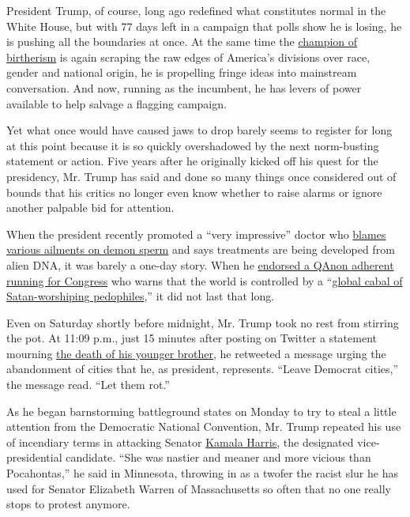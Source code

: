 President Trump, of course, long ago redefined what constitutes normal
in the White House, but with 77 days left in a campaign that polls show
he is losing, he is pushing all the boundaries at once. At the same time
the
\href{https://www.nytimes3xbfgragh.onion/2016/09/17/us/politics/donald-trump-obama-birther.html}{champion
of birtherism} is again scraping the raw edges of America's divisions
over race, gender and national origin, he is propelling fringe ideas
into mainstream conversation. And now, running as the incumbent, he has
levers of power available to help salvage a flagging campaign.

Yet what once would have caused jaws to drop barely seems to register
for long at this point because it is so quickly overshadowed by the next
norm-busting statement or action. Five years after he originally kicked
off his quest for the presidency, Mr. Trump has said and done so many
things once considered out of bounds that his critics no longer even
know whether to raise alarms or ignore another palpable bid for
attention.

When the president recently promoted a ``very impressive'' doctor who
\href{https://www.thedailybeast.com/stella-immanuel-trumps-new-covid-doctor-believes-in-alien-dna-demon-sperm-and-hydroxychloroquine}{blames
various ailments on demon sperm} and says treatments are being developed
from alien DNA, it was barely a one-day story. When he
\href{https://www.nytimes3xbfgragh.onion/2020/08/15/us/elections/trump-refrains-from-disavowing-qanon-conspiracy.html}{endorsed
a QAnon adherent running for Congress} who warns that the world is
controlled by a
``\href{https://www.youtube.com/watch?time_continue=11\&v=2rtYok4fdbQ\&feature=emb_title}{global
cabal of Satan-worshiping pedophiles},'' it did not last that long.

Even on Saturday shortly before midnight, Mr. Trump took no rest from
stirring the pot. At 11:09 p.m., just 15 minutes after posting on
Twitter a statement mourning
\href{https://www.nytimes3xbfgragh.onion/2020/08/15/us/politics/robert-s-trump-dead.html}{the
death of his younger brother}, he retweeted a message urging the
abandonment of cities that he, as president, represents. ``Leave
Democrat cities,'' the message read. ``Let them rot.''

As he began barnstorming battleground states on Monday to try to steal a
little attention from the Democratic National Convention, Mr. Trump
repeated his use of incendiary terms in attacking Senator
\href{https://www.nytimes3xbfgragh.onion/2020/08/14/technology/kamala-harris-disinformation.html}{Kamala
Harris}, the designated vice-presidential candidate. ``She was nastier
and meaner and more vicious than Pocahontas,'' he said in Minnesota,
throwing in as a twofer the racist slur he has used for Senator
Elizabeth Warren of Massachusetts so often that no one really stops to
protest anymore.

